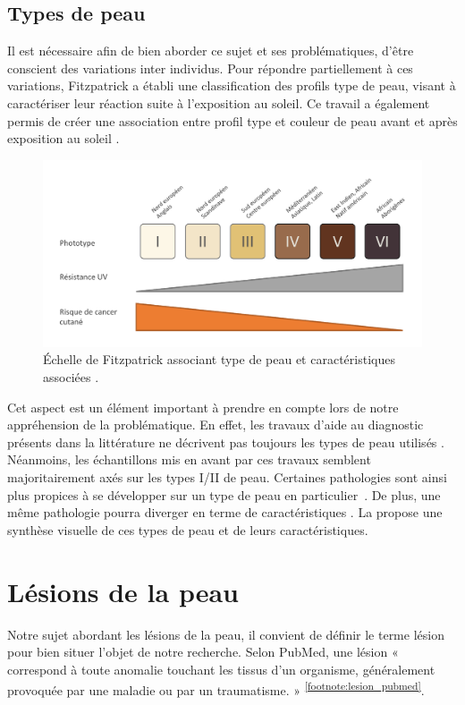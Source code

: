 \subsection{Types de peau}
Il est nécessaire afin de bien aborder ce sujet et ses problématiques, d’être conscient des variations inter individus. Pour répondre partiellement à ces variations, Fitzpatrick a établi une classification des profils type de peau, visant à caractériser leur réaction suite à l’exposition au soleil. Ce travail a également permis de créer une association entre profil type et couleur de peau avant et après exposition au soleil \cite{Fitzpatrick1988}. 
\begin{figure}[H]
    \centering
    \includegraphics[width=0.8\linewidth]{contents/chapter_1/resources/scheme_fitzpatrick_scale.pdf}
    \caption{Échelle de Fitzpatrick associant type de peau et caractéristiques associées \cite{Fitzpatrick1988}.}
    \label{fig:scheme_fitzpatrick_scale}
\end{figure}
Cet aspect est un élément important à prendre en compte lors de notre appréhension de la problématique. En effet, les travaux d'aide au diagnostic présents dans la littérature ne décrivent pas toujours les types de peau utilisés \cite{Celebi2007,Wiltgen2008,Koller2011}. Néanmoins, les échantillons mis en avant par ces travaux semblent majoritairement axés sur les types I/II de peau. Certaines pathologies sont ainsi plus propices à se développer sur un type de peau en particulier~\cite{Narayanan2010}. De plus, une même pathologie pourra diverger en terme de caractéristiques \cite{Tuma2015}. La  propose une synthèse visuelle de ces types de peau et de leurs caractéristiques.

\section{Lésions de la peau}
Notre sujet abordant les lésions de la peau, il convient de définir le terme lésion pour bien situer l’objet de notre recherche. Selon PubMed, une lésion « correspond à toute anomalie touchant les tissus d’un organisme, généralement provoquée par une maladie ou par un traumatisme. » \textsuperscript{\ref{footnote:lesion_pubmed}}.\par
\addtocounter{footnote}{1}

